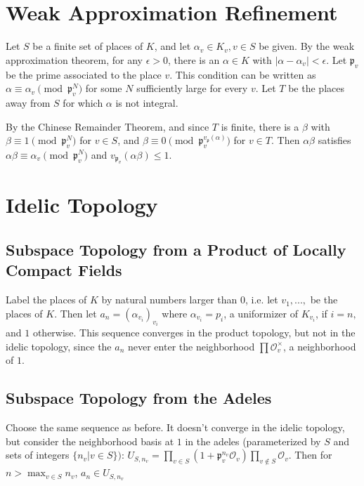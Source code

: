 \documentclass[11pt]{amsart}
\theoremstyle{named}
\begin{document}
\section{Weak Approximation Refinement}
Let $S$ be a finite set of places of $K$, and let $\alpha_v \in K_v, v \in S$ be given. By the weak approximation theorem, for any $\epsilon > 0$, there is an $\alpha \in K$ with $|\alpha - \alpha_v| < \epsilon$. Let $\mathfrak{p}_v$ be the prime associated to the place $v$. This condition can be written as $\alpha \equiv \alpha_v \pmod{\mathfrak{p}_v^N}$ for some $N$ sufficiently large for every $v$. Let $T$ be the places away from $S$ for which $\alpha$ is not integral.

By the Chinese Remainder Theorem, and since $T$ is finite, there is a $\beta$ with $\beta \equiv 1 \pmod{\mathfrak{p}_v^N}$ for $v \in S$, and $\beta \equiv 0 \pmod{\mathfrak{p}_v^{v_{\mathfrak{p}}(\alpha)}}$ for $v \in T$. Then $\alpha \beta$ satisfies $\alpha \beta \equiv \alpha_v \pmod{\mathfrak{p}_v^N}$ and $v_{\mathfrak{p}_v}(\alpha \beta) \leq 1$.

\section{Idelic Topology}
\subsection{Subspace Topology from a Product of Locally Compact Fields} Label the places of $K$ by natural numbers larger than 0, i.e. let $v_1, ..., $ be the places of $K$. Then let $a_n = (\alpha_{v_i})_{v_i}$ where $\alpha_{v_i} = p_i$, a uniformizer of $K_{v_i}$, if $i = n,$ and $1$ otherwise. This sequence converges in the product topology, but not in the idelic topology, since the $a_n$ never enter the neighborhood $\prod \mathcal{O}_v^\times$, a neighborhood of $1$. 

\subsection{Subspace Topology from the Adeles} Choose the same sequence as before. It doesn't converge in the idelic topology, but consider the neighborhood basis at $1$ in the adeles (parameterized by $S$ and sets of integers $\{ n_v | v \in S \})$: $U_{S, n_v} = \prod_{v \in S} (1 + \mathfrak{p}_v^{n_v} \mathcal{O}_v) \prod_{v \not\in S} \mathcal{O}_v$. Then for $n > \max_{v \in S} n_v$, $a_n \in U_{S, n_v}$ 
\end{document}
